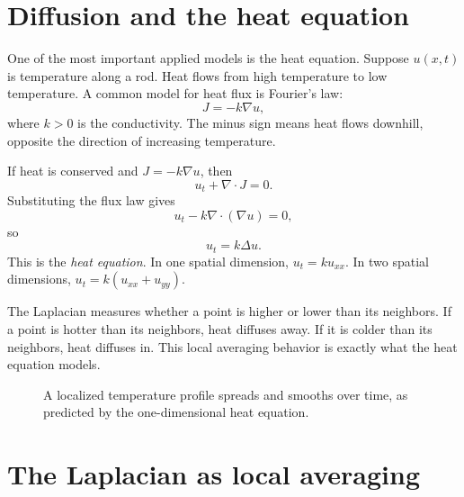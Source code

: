 \documentclass[11pt]{article}
\newcommand{\grad}{\nabla}
\newcommand{\Div}{\nabla\!\cdot}
\newcommand{\Lap}{\Delta}
\begin{document}
\section{Diffusion and the heat equation}

One of the most important applied models is the heat equation. Suppose $u(x,t)$ is temperature along a rod. Heat flows from high temperature to low temperature. A common model for heat flux is Fourier's law:
\[
J=-k\grad u,
\]
where $k>0$ is the conductivity. The minus sign means heat flows downhill, opposite the direction of increasing temperature.

If heat is conserved and $J=-k\grad u$, then
\[
u_t+\Div J=0.
\]
Substituting the flux law gives
\[
u_t-k\Div(\grad u)=0,
\]
so
\[
u_t=k\Lap u.
\]
This is the \emph{heat equation}. In one spatial dimension, $u_t=ku_{xx}$. In two spatial dimensions, $u_t=k(u_{xx}+u_{yy})$.

\begin{notebox}
The Laplacian measures whether a point is higher or lower than its neighbors. If a point is hotter than its neighbors, heat diffuses away. If it is colder than its neighbors, heat diffuses in. This local averaging behavior is exactly what the heat equation models.
\end{notebox}

\begin{figure}[H]
\centering
{}
\caption{A localized temperature profile spreads and smooths over time, as predicted by the one-dimensional heat equation.}
\end{figure}

\section{The Laplacian as local averaging}
\end{document}

